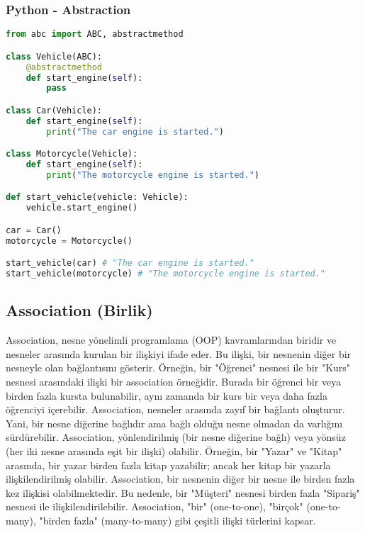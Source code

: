 \subsubsection{Python - Abstraction}

\begin{lstlisting}[language=Python]
from abc import ABC, abstractmethod

class Vehicle(ABC):
    @abstractmethod
    def start_engine(self):
        pass

class Car(Vehicle):
    def start_engine(self):
        print("The car engine is started.")

class Motorcycle(Vehicle):
    def start_engine(self):
        print("The motorcycle engine is started.")

def start_vehicle(vehicle: Vehicle):
    vehicle.start_engine()

car = Car()
motorcycle = Motorcycle()

start_vehicle(car) # "The car engine is started."
start_vehicle(motorcycle) # "The motorcycle engine is started."
\end{lstlisting}

\newpage

\subsection{Association (Birlik)}

Association, nesne yönelimli programlama (OOP) kavramlarından biridir ve nesneler arasında kurulan bir ilişkiyi ifade eder. Bu ilişki, bir nesnenin diğer bir nesneyle olan bağlantısını gösterir. Örneğin, bir "Öğrenci" nesnesi ile bir "Kurs" nesnesi arasındaki ilişki bir association örneğidir. Burada bir öğrenci bir veya birden fazla kursta bulunabilir, aynı zamanda bir kurs bir veya daha fazla öğrenciyi içerebilir. Association, nesneler arasında zayıf bir bağlantı oluşturur. Yani, bir nesne diğerine bağlıdır ama bağlı olduğu nesne olmadan da varlığını sürdürebilir. Association, yönlendirilmiş (bir nesne diğerine bağlı) veya yönsüz (her iki nesne arasında eşit bir ilişki) olabilir. Örneğin, bir "Yazar" ve "Kitap" arasında, bir yazar birden fazla kitap yazabilir; ancak her kitap bir yazarla ilişkilendirilmiş olabilir.  Association, bir nesnenin diğer bir nesne ile birden fazla kez ilişkisi olabilmektedir. Bu nedenle, bir "Müşteri" nesnesi birden fazla "Sipariş" nesnesi ile ilişkilendirilebilir. Association, "bir" (one-to-one), "birçok" (one-to-many), "birden fazla" (many-to-many) gibi çeşitli ilişki türlerini kapsar.

